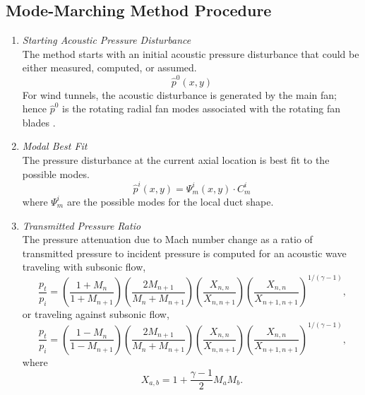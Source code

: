 \subsection{Mode-Marching Method Procedure}
\label{sect:03_test_section_mode_marching}
\begin{enumerate}
  \item \textit{Starting Acoustic Pressure Disturbance} \\
  The method starts with an initial acoustic pressure disturbance that could be either measured, computed, or assumed.
  \begin{equation}
    \hat{p}^0(x,y)
  \end{equation}
  For wind tunnels, the acoustic disturbance is generated by the main fan; hence $\hat{p}^0$ is the rotating radial fan modes associated with the rotating fan blades \cite{Cumpsty-1989-8wEYqb7t}.

  \item \textit{Modal Best Fit} \\
  The pressure disturbance at the current axial location is best fit to the possible modes.
  \begin{equation}
    \hat{p}^i(x,y)=\Psi_m^i(x,y)\cdot C_m^i
  \end{equation}
  where $\Psi_m^i$ are the possible modes for the local duct shape.

  \item \textit{Transmitted Pressure Ratio} \\
  The pressure attenuation due to Mach number change \cite{Powell-1959-W7KVArvn} as a ratio of transmitted pressure to incident pressure is computed for an acoustic wave traveling with subsonic flow,
  \begin{equation}
    \frac{p_t}{p_i} = \left(\frac{1+M_n}{1+M_{n+1}}\right)\left(\frac{2M_{n+1}}{M_n+M_{n+1}}\right)\left(\frac{X_{n,n}}{X_{n,n+1}}\right)\left(\frac{X_{n,n}}{X_{n+1,n+1}}\right)^{1/(\gamma-1)} \textrm{,}
    \label{eqn:03_pressure_ratio_with}
  \end{equation}
  or traveling against subsonic flow,
  \begin{equation}
    \frac{p_t}{p_i} = \left(\frac{1-M_n}{1-M_{n+1}}\right)\left(\frac{2M_{n+1}}{M_n+M_{n+1}}\right)\left(\frac{X_{n,n}}{X_{n,n+1}}\right)\left(\frac{X_{n,n}}{X_{n+1,n+1}}\right)^{1/(\gamma-1)} \textrm{,}
    \label{eqn:03_pressure_ratio_against}
  \end{equation}
  where
  \begin{equation}
    X_{a,b} = 1+\frac{\gamma-1}{2}M_aM_b \textrm{.}
  \end{equation}


\end{enumerate}
